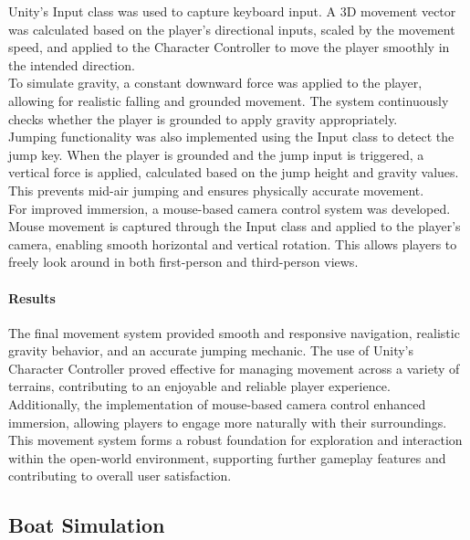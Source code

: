\documentclass{article}
\begin{document}
Unity's Input class was used to capture keyboard input. A 3D movement vector was calculated based on the player's directional inputs, scaled by the movement speed, and applied to the Character Controller to move the player smoothly in the intended direction.\\

To simulate gravity, a constant downward force was applied to the player, allowing for realistic falling and grounded movement. The system continuously checks whether the player is grounded to apply gravity appropriately.\\

Jumping functionality was also implemented using the Input class to detect the jump key. When the player is grounded and the jump input is triggered, a vertical force is applied, calculated based on the jump height and gravity values. This prevents mid-air jumping and ensures physically accurate movement.\\

For improved immersion, a mouse-based camera control system was developed. Mouse movement is captured through the Input class and applied to the player's camera, enabling smooth horizontal and vertical rotation. This allows players to freely look around in both first-person and third-person views.

\paragraph{Results}\hfill

The final movement system provided smooth and responsive navigation, realistic gravity behavior, and an accurate jumping mechanic. The use of Unity's Character Controller proved effective for managing movement across a variety of terrains, contributing to an enjoyable and reliable player experience.\\

Additionally, the implementation of mouse-based camera control enhanced immersion, allowing players to engage more naturally with their surroundings. This movement system forms a robust foundation for exploration and interaction within the open-world environment, supporting further gameplay features and contributing to overall user satisfaction.










\newpage
\subsection{Boat Simulation}
\end{document}
